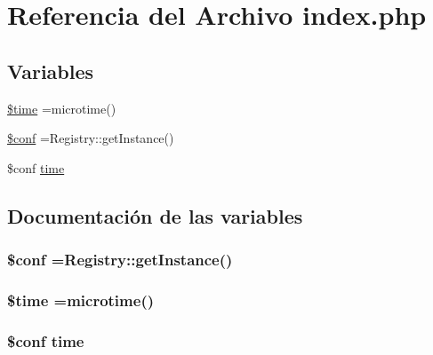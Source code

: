 \hypertarget{index_8php}{}\section{Referencia del Archivo index.\+php}
\label{index_8php}
\subsection*{Variables}
\begin{DoxyCompactItemize}
\item 
\hyperlink{index_8php_a78db1a0602e3b6ac1d9a1b5ec103c160}{\$time} =microtime()
\item 
\hyperlink{index_8php_ae4901046cc3e1deebf77ccc785384a78}{\$conf} =Registry\+::get\+Instance()
\item 
\$conf \hyperlink{index_8php_a13b3f51c9acf13beca6678d5e64b1f45}{time}
\end{DoxyCompactItemize}


\subsection{Documentación de las variables}
\hypertarget{index_8php_ae4901046cc3e1deebf77ccc785384a78}{}
\subsubsection[{\$conf}]{\setlength{\rightskip}{0pt plus 5cm}\$conf =Registry\+::get\+Instance()}\label{index_8php_ae4901046cc3e1deebf77ccc785384a78}
\hypertarget{index_8php_a78db1a0602e3b6ac1d9a1b5ec103c160}{}
\subsubsection[{\$time}]{\setlength{\rightskip}{0pt plus 5cm}\${\bf time} =microtime()}\label{index_8php_a78db1a0602e3b6ac1d9a1b5ec103c160}
\hypertarget{index_8php_a13b3f51c9acf13beca6678d5e64b1f45}{}
\subsubsection[{time}]{\setlength{\rightskip}{0pt plus 5cm}\$conf time}\label{index_8php_a13b3f51c9acf13beca6678d5e64b1f45}
